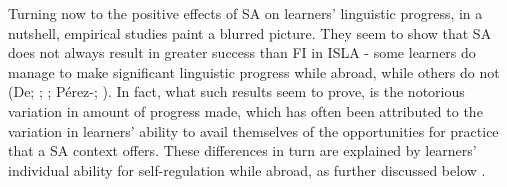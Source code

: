 Turning now to the positive effects of SA on learners’ linguistic progress, in a nutshell, empirical studies paint a blurred picture. They seem to show that SA does not always result in greater success than FI in ISLA -  some learners do manage to make significant linguistic progress while abroad, while others do not (De\citealt{Keyser2007}; \citealt{Collentine2009}; \citealt{Llanes2011}; Pérez-\citealt{Vidal2015b}; \citealt{Sanz2014}). In fact, what such results seem to prove, is the notorious variation in amount of progress made, which has often been attributed to the variation in learners’ ability to avail themselves of the opportunities for practice that a SA context offers. These differences in turn are explained by learners’ individual ability for self-regulation while abroad, as further discussed below \citet{UshiodaDörnyei2012}. 

